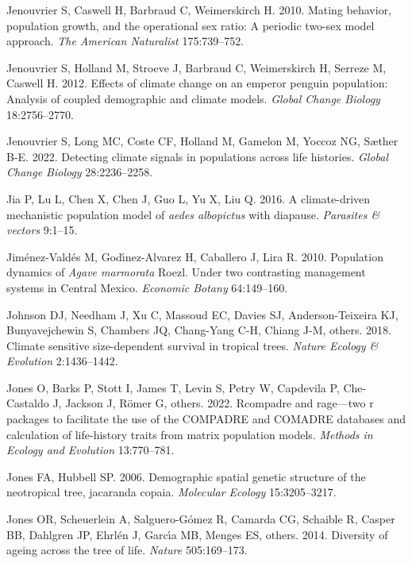 \documentclass[
  12pt,
  letterpaper,
]{book}
\newlength{\cslhangindent}
\newenvironment{CSLReferences}[2] %
 {\begin{list}{}{%
  \setlength{\itemindent}{0pt}
  \setlength{\leftmargin}{0pt}
  \setlength{\parsep}{0pt}
  \ifodd #1
   \setlength{\leftmargin}{\cslhangindent}
   \setlength{\itemindent}{-1\cslhangindent}
  \fi
  \setlength{\itemsep}{#2\baselineskip}}}
 {\end{list}}
\begin{document}
\begin{CSLReferences}{1}{0}
Jenouvrier S, Caswell H, Barbraud C, Weimerskirch H. 2010. Mating
behavior, population growth, and the operational sex ratio: A periodic
two-sex model approach. \emph{The American Naturalist} 175:739--752.

Jenouvrier S, Holland M, Stroeve J, Barbraud C, Weimerskirch H, Serreze
M, Caswell H. 2012. Effects of climate change on an emperor penguin
population: Analysis of coupled demographic and climate models.
\emph{Global Change Biology} 18:2756--2770.

Jenouvrier S, Long MC, Coste CF, Holland M, Gamelon M, Yoccoz NG, Sæther
B-E. 2022. Detecting climate signals in populations across life
histories. \emph{Global Change Biology} 28:2236--2258.

Jia P, Lu L, Chen X, Chen J, Guo L, Yu X, Liu Q. 2016. A climate-driven
mechanistic population model of \emph{aedes {a}lbopictus} with diapause.
\emph{Parasites \& vectors} 9:1--15.

Jiménez-Valdés M, Godı́nez-Alvarez H, Caballero J, Lira R. 2010.
Population dynamics of \emph{{A}gave {m}armorata} {R}oezl. Under two
contrasting management systems in {C}entral {M}exico. \emph{Economic
Botany} 64:149--160.

Johnson DJ, Needham J, Xu C, Massoud EC, Davies SJ, Anderson-Teixeira
KJ, Bunyavejchewin S, Chambers JQ, Chang-Yang C-H, Chiang J-M, others.
2018. Climate sensitive size-dependent survival in tropical trees.
\emph{Nature Ecology \& Evolution} 2:1436--1442.

Jones O, Barks P, Stott I, James T, Levin S, Petry W, Capdevila P,
Che-Castaldo J, Jackson J, Römer G, others. 2022. Rcompadre and
rage---two r packages to facilitate the use of the COMPADRE and COMADRE
databases and calculation of life-history traits from matrix population
models. \emph{Methods in Ecology and Evolution} 13:770--781.

Jones FA, Hubbell SP. 2006. Demographic spatial genetic structure of the
neotropical tree, jacaranda copaia. \emph{Molecular Ecology}
15:3205--3217.

Jones OR, Scheuerlein A, Salguero-Gómez R, Camarda CG, Schaible R,
Casper BB, Dahlgren JP, Ehrlén J, Garcı́a MB, Menges ES, others. 2014.
Diversity of ageing across the tree of life. \emph{Nature} 505:169--173.


\end{CSLReferences}
\end{document}
